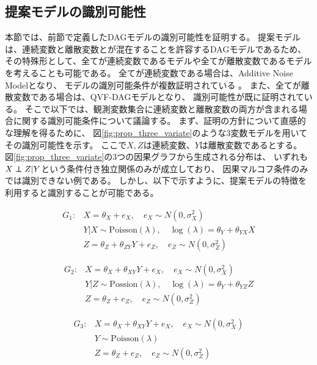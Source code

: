 
\subsection{提案モデルの識別可能性}

本節では、前節で定義したDAGモデルの識別可能性を証明する。
提案モデルは、連続変数と離散変数とが混在することを許容するDAGモデルであるため、
その特殊形として、全てが連続変数であるモデルや全てが離散変数であるモデルを考えることも可能である。
全てが連続変数である場合は、Additive Noise Modelとなり、
モデルの識別可能条件が複数証明されている\cite{Shimizu2006-yu}
\cite{Hoyer2008-oo}
\cite{Peters2013-eb}
\cite{Peters2014-ro}
\cite{Park2020-ey}。
また、全てが離散変数である場合は、QVF-DAGモデル\cite{Park2017-hw}となり、
識別可能性が既に証明されている\cite{Park2017-hw}。
そこで以下では、観測変数集合に連続変数と離散変数の両方が含まれる場合に関する識別可能条件について議論する。
まず、証明の方針について直感的な理解を得るために、
図\ref{fig:prop_three_variate}のような3変数モデルを用いてその識別可能性を示す。
ここで$X,Z$は連続変数、$Y$は離散変数であるとする。
図\ref{fig:prop_three_variate}の3つの因果グラフから生成される分布は、
いずれも$X \mathop{\,\perp\!\!\!\!\!\perp\,} Z | Y$という条件付き独立関係のみが成立しており、
因果マルコフ条件のみでは識別できない例である。
しかし、以下で示すように、提案モデルの特徴を利用すると識別することが可能である。

\begin{align*}
  G_1 \colon & X = \theta_{X} + e_X, \quad e_X \sim N(0, \sigma_X^2) \\
             & Y|X \sim \mathrm{Poisson}(\lambda), \quad \log(\lambda) = \theta_Y + \theta_{YX}X \\
             & Z = \theta_Z + \theta_{ZY}Y + e_Z, \quad e_Z \sim N(0, \sigma_Z^2)
\end{align*}

\begin{align*}
  G_2 \colon & X = \theta_X + \theta_{XY}Y + e_X, \quad e_X \sim N(0, \sigma_X^2) \\
             & Y|Z \sim \mathrm{Possion}(\lambda), \quad \log(\lambda) = \theta_Y + \theta_{YZ}Z \\
             & Z = \theta_{Z} + e_Z, \quad e_Z \sim N(0, \sigma_Z^2)
\end{align*}

\begin{align*}
  G_3 \colon & X = \theta_X + \theta_{XY}Y + e_X, \quad e_X \sim N(0, \sigma_X^2) \\
             & Y \sim \mathrm{Poisson}(\lambda) \\
             & Z = \theta_{Z} + e_Z, \quad e_Z \sim N(0, \sigma_Z^2)
\end{align*}

